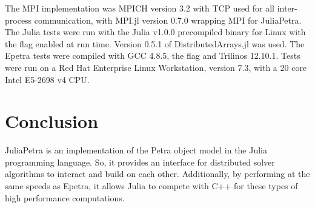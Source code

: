 \documentclass[acmsmall]{acmart}
\newcommand{\snippet}[1]{\texttt{\detokenize{#1}}}
\begin{document}
	The MPI implementation was MPICH version 3.2 with TCP used for all inter-process communication, with MPI.jl version 0.7.0 wrapping MPI for JuliaPetra.
	The Julia tests were run with the Julia v1.0.0 precompiled binary for Linux with the \snippet{-O3} flag enabled at run time.
	Version 0.5.1 of DistributedArrays.jl was used.
	The Epetra tests were compiled with GCC 4.8.5, the \snippet{-O3} flag and Trilinos 12.10.1.
	Tests were run on a Red Hat Enterprise Linux Workstation, version 7.3,
	with a 20 core Intel E5-2698 v4 CPU.
	
	\section{Conclusion}
	
	JuliaPetra is an implementation of the Petra object model in the Julia programming language.
	So, it provides an interface for distributed solver algorithms to interact and build on each other.
	Additionally, by performing at the same speeds as Epetra,
	it allows Julia to compete with C++ for these types of high performance computations.
	
	
	
\end{document}
